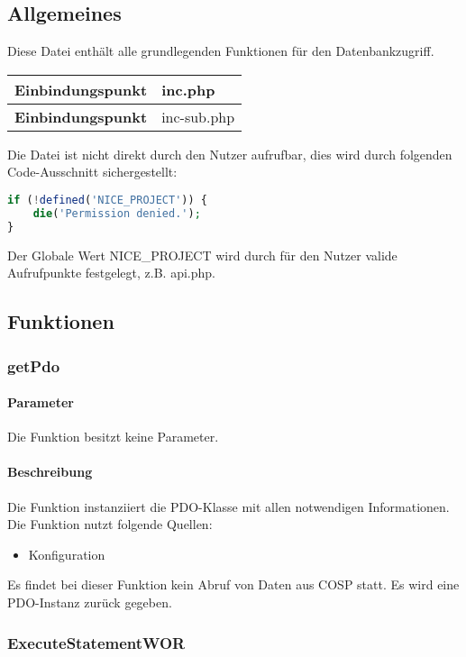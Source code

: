 \subsection{Allgemeines} Diese Datei enthält alle grundlegenden Funktionen für den Datenbankzugriff.
\begin{table}[H]
	\begin{tabular}{|c|p{11cm}|}
		\hline
		\textbf{Einbindungspunkt} & inc.php \\ \hline
		\textbf{Einbindungspunkt} & inc-sub.php \\ \hline
	\end{tabular}
\end{table}
Die Datei ist nicht direkt durch den Nutzer aufrufbar, dies wird durch folgenden Code-Ausschnitt sichergestellt:
\begin{lstlisting}[language=php]
if (!defined('NICE_PROJECT')) {
	die('Permission denied.');
}
\end{lstlisting}
Der Globale Wert {\glqq NICE\_PROJECT\grqq} wird durch für den Nutzer valide Aufrufpunkte festgelegt, z.B. {\glqq api.php\grqq}.
\newpage
\subsection{Funktionen}
\subsubsection{getPdo}
\paragraph{Parameter} Die Funktion besitzt keine Parameter.
\paragraph{Beschreibung} Die Funktion instanziiert die PDO-Klasse mit allen notwendigen Informationen. Die Funktion nutzt folgende Quellen:
\begin{itemize}
	\item Konfiguration
\end{itemize}
Es findet bei dieser Funktion kein Abruf von Daten aus {\glqq COSP\grqq} statt. Es wird eine PDO-Instanz zurück gegeben.
\subsubsection{ExecuteStatementWOR}
